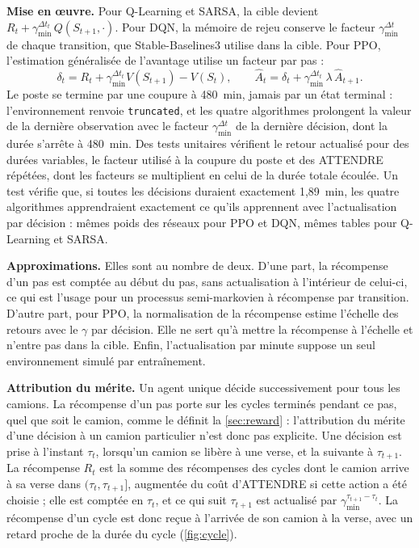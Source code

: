 \documentclass[11pt,a4paper]{article}
\newif\ifrevmarks
\newcommand{\revtag}[1]{\ifrevmarks\textsuperscript{\textcolor{red!70!black}{\scriptsize[#1]}}\fi}
\newenvironment{revbloc}[1]{\par\ifrevmarks\color{revcolor}\noindent\revtag{#1}\ \fi}{\par}
\newif\ifcorrmarks
\newcommand{\corr}[1]{\ifcorrmarks\textcolor{corrcolor}{#1}\else#1\fi}
\begin{document}
\begin{revbloc}{M9, v3}
\textbf{Mise en œuvre.} Pour Q-Learning et SARSA, la cible devient $R_t + \gamma_{\min}^{\Delta t_t}\, Q(S_{t+1}, \cdot)$. Pour DQN, la mémoire de rejeu conserve le facteur $\gamma_{\min}^{\Delta t}$ de chaque transition, que Stable-Baselines3 utilise dans la cible. Pour PPO, l'estimation généralisée de l'avantage utilise un facteur par pas :
\begin{equation}
\delta_t = R_t + \gamma_{\min}^{\Delta t_t} V(S_{t+1}) - V(S_t), \qquad
\hat{A}_t = \delta_t + \gamma_{\min}^{\Delta t_t}\, \lambda\, \hat{A}_{t+1} .
\end{equation}
\corr{Le poste se termine par une coupure à 480~min, jamais par un état terminal : l'environnement renvoie \texttt{truncated}, et les quatre algorithmes prolongent la valeur de la dernière observation avec le facteur $\gamma_{\min}^{\Delta t}$ de la dernière décision, dont la durée s'arrête à 480~min.} \corr{Des tests unitaires vérifient le retour actualisé pour des durées variables, le facteur utilisé à la coupure du poste et des ATTENDRE répétées, dont les facteurs se multiplient en celui de la durée totale écoulée.} Un test vérifie que, si toutes les décisions duraient exactement 1,89~min, les quatre algorithmes apprendraient exactement ce qu'ils apprennent avec l'actualisation par décision : mêmes poids des réseaux pour PPO et DQN, mêmes tables pour Q-Learning et SARSA.

\textbf{Approximations.} Elles sont au nombre de deux. D'une part, la récompense d'un pas est comptée au début du pas, sans actualisation à l'intérieur de celui-ci, ce qui est l'usage pour un processus semi-markovien à récompense par transition. D'autre part, pour PPO, la normalisation de la récompense estime l'échelle des retours avec le $\gamma$ par décision. Elle ne sert qu'à mettre la récompense à l'échelle et n'entre pas dans la cible. Enfin, l'actualisation par minute suppose un seul environnement simulé par entraînement.

\textbf{Attribution du mérite.} Un agent unique décide successivement pour tous les camions. La récompense d'un pas porte sur les cycles terminés pendant ce pas, quel que soit le camion, comme le définit la \cref{sec:reward} : l'attribution du mérite d'une décision à un camion particulier n'est donc pas explicite. \corr{Une décision est prise à l'instant $\tau_t$, lorsqu'un camion se libère à une verse, et la suivante à $\tau_{t+1}$. La récompense $R_t$ est la somme des récompenses des cycles dont le camion arrive à sa verse dans $(\tau_t, \tau_{t+1}]$, augmentée du coût d'ATTENDRE si cette action a été choisie ; elle est comptée en $\tau_t$, et ce qui suit $\tau_{t+1}$ est actualisé par $\gamma_{\min}^{\tau_{t+1}-\tau_t}$. La récompense d'un cycle est donc reçue à l'arrivée de son camion à la verse, avec un retard proche de la durée du cycle (\cref{fig:cycle}).}
\end{revbloc}
\end{document}
